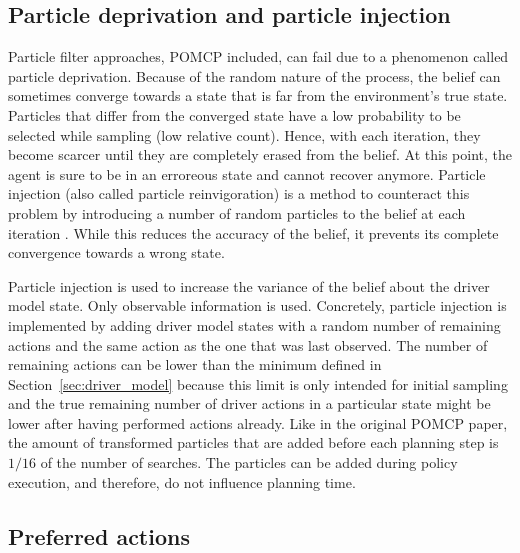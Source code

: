 
\subsection{Particle deprivation and particle injection}
\label{sec:particle_deprivation}

Particle filter approaches, POMCP included, can fail due to a phenomenon called particle deprivation. Because of the random nature of the process, the belief can sometimes converge towards a state that is far from the environment's true state. Particles that differ from the converged state have a low probability to be selected while sampling (low relative count). Hence, with each iteration, they become scarcer until they are completely erased from the belief. At this point, the agent is sure to be in an erroreous state and cannot recover anymore. Particle injection (also called particle reinvigoration) is a method to counteract this problem by introducing a number of random particles to the belief at each iteration \parencite{decision_making_book}. While this reduces the accuracy of the belief, it prevents its complete convergence towards a wrong state. 

Particle injection is used to increase the variance of the belief about the driver model state. Only observable information is used. Concretely, particle injection is implemented by adding driver model states with a random number of remaining actions and the same action as the one that was last observed. The number of remaining actions can be lower than the minimum defined in Section~\ref{sec:driver_model} because this limit is only intended for initial sampling and the true remaining number of driver actions in a particular state might be lower after having performed actions already. Like in the original POMCP paper, the amount of transformed particles that are added before each planning step is $1/16$ of the number of searches. The particles can be added during policy execution, and therefore, do not influence planning time.



\subsection{Preferred actions}
\label{sec:preferred_actions}


